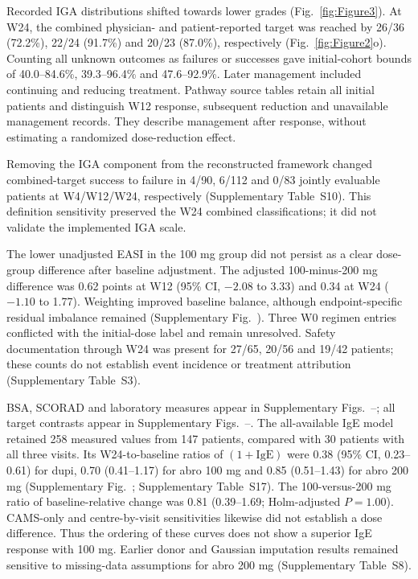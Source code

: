 
Recorded IGA distributions shifted towards lower grades (Fig.~\ref{fig:Figure3}). At W24, the combined physician- and patient-reported target was reached by 26/36 (72.2\%), 22/24 (91.7\%) and 20/23 (87.0\%), respectively (Fig.~\ref{fig:Figure2}o). Counting all unknown outcomes as failures or successes gave initial-cohort bounds of 40.0--84.6\%, 39.3--96.4\% and 47.6--92.9\%. Later management included continuing and reducing treatment. Pathway source tables retain all initial patients and distinguish W12 response, subsequent reduction and unavailable management records. They describe management after response, without estimating a randomized dose-reduction effect.

Removing the IGA component from the reconstructed framework changed combined-target success to failure in 4/90, 6/112 and 0/83 jointly evaluable patients at W4/W12/W24, respectively (Supplementary Table~S10). This definition sensitivity preserved the W24 combined classifications; it did not validate the implemented IGA scale.


The lower unadjusted EASI in the 100 mg group did not persist as a clear dose-group difference after baseline adjustment. The adjusted 100-minus-200 mg difference was 0.62 points at W12 (95\% CI, $-2.08$ to 3.33) and 0.34 at W24 ($-1.10$ to 1.77). Weighting improved baseline balance, although endpoint-specific residual imbalance remained (Supplementary Fig.~). Three W0 regimen entries conflicted with the initial-dose label and remain unresolved. Safety documentation through W24 was present for 27/65, 20/56 and 19/42 patients; these counts do not establish event incidence or treatment attribution (Supplementary Table~S3).

BSA, SCORAD and laboratory measures appear in Supplementary Figs.~--; all target contrasts appear in Supplementary Figs.~--. The all-available IgE model retained 258 measured values from 147 patients, compared with 30 patients with all three visits. Its W24-to-baseline ratios of $(1+\mathrm{IgE})$ were 0.38 (95\% CI, 0.23--0.61) for dupi, 0.70 (0.41--1.17) for abro 100 mg and 0.85 (0.51--1.43) for abro 200 mg (Supplementary Fig.~; Supplementary Table~S17). The 100-versus-200 mg ratio of baseline-relative change was 0.81 (0.39--1.69; Holm-adjusted $P=1.00$). CAMS-only and centre-by-visit sensitivities likewise did not establish a dose difference. Thus the ordering of these curves does not show a superior IgE response with 100 mg. Earlier donor and Gaussian imputation results remained sensitive to missing-data assumptions for abro 200 mg (Supplementary Table~S8).

